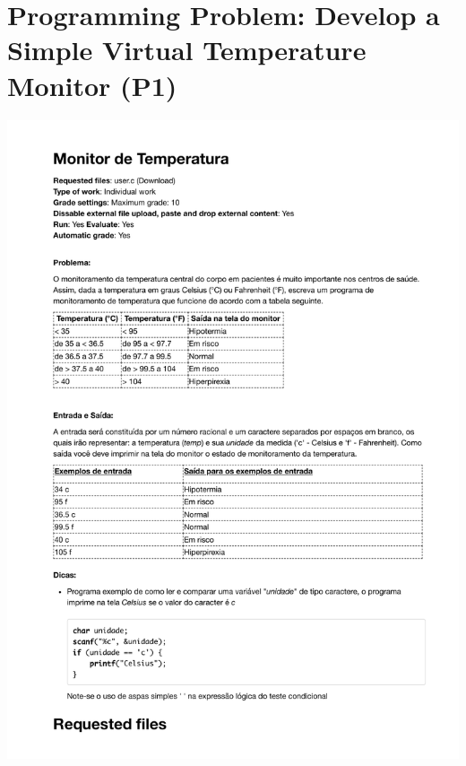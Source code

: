 \section{Programming Problem: Develop a Simple Virtual Temperature Monitor (P1)}
\label{annex:first-study-p1}
\includegraphics[page=1,width=1\textwidth]{images/annex/first-study-p1.pdf}

\newpage
